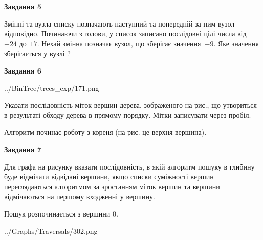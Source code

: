 \documentclass[12pt, ukrainian]{article}
\begin{document}
{\begin {large}
{\begin {center}\textbf{Завдання 5}\end {center}}\par
Змінні  та  вузла списку позначають наступний та попередній за ним вузол відповідно. Починаючи з голови, у список записано послідовні цілі числа від~$-24$ до~$17$. Нехай змінна  позначає вузол, що зберігає значення~$-9$.
Яке значення зберігається у вузлі  ?\par
\newpage

{\begin {center}\textbf{Завдання 6}\end {center}}\par

\begin{center}
	{../BinTree/trees_exp/171.png}
\end{center}
Указати послідовність міток вершин дерева, зображеного на рис., що утвориться в результаті обходу дерева в прямому порядку. Мітки записувати через пробіл.\par Алгоритм починає роботу з кореня (на рис. це верхня вершина).\par
\newpage

{\begin {center}\textbf{Завдання 7}\end {center}}\par
Для графа на рисунку вказати послідовність, в якій алгоритм пошуку в глибину буде відмічати відвідані вершини, якщо списки суміжності вершин переглядаються алгоритмом за зростанням міток вершин та вершини відмічаються на першому вход\-женні у вершину.\par
Пошук розпочинається з вершини 0.\par

\begin{center}
	{../Graphs/Traversals/302.png}
\end{center}\par
\newpage


\end{large}}
\end{document}
